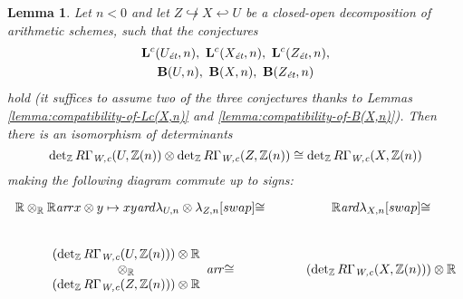 \documentclass[10pt,a4paper,oneside]{article}
\newcommand{\RR}{\mathbb{R}}
\newcommand{\ZZ}{\mathbb{Z}}
\renewcommand{\det}{\operatorname{det}}
\newcommand{\ar}{\text{\it ar}}
\newcommand{\et}{\text{\it \'{e}t}}
\newcommand{\Wc}{\text{\it W,c}}
\theoremstyle{myplain}
\newtheorem{lemma}[theorem]{Lemma}
\theoremstyle{mydefinition}
\numberwithin{equation}{section}
\begin{document}
\begin{lemma}
  \label{lemma:lambda-and-closed-open-decompositions}
  Let $n < 0$ and let $Z \not\hookrightarrow X \hookleftarrow U$ be a
  closed-open decomposition of arithmetic schemes, such that the conjectures
  \begin{gather*}
    \mathbf{L}^c (U_\et,n), ~ \mathbf{L}^c (X_\et,n), ~ \mathbf{L}^c (Z_\et,n),\\
    \mathbf{B} (U,n), ~ \mathbf{B} (X,n), ~ \mathbf{B} (Z_\et,n)
  \end{gather*}
  hold (it suffices to assume two of the three conjectures thanks to Lemmas
  \ref{lemma:compatibility-of-Lc(X,n)} and \ref{lemma:compatibility-of-B(X,n)}).
  Then there is an isomorphism of determinants
  \begin{equation}
    \label{eqn:isomorphism-of-det-RGamma-Wc-for-closed-open-decompositions}
    \det_\ZZ R\Gamma_\Wc (U, \ZZ(n)) \otimes
    \det_\ZZ R\Gamma_\Wc (Z, \ZZ(n)) \cong
    \det_\ZZ R\Gamma_\Wc (X, \ZZ(n))
  \end{equation}
  making the following diagram commute up to signs:
  \begin{equation}
    \label{eqn:lambda-and-closed-open-decompositions}
    \begin{tikzcd}
      \RR \otimes_\RR \RR \ar{r}{x\otimes y \mapsto xy}\ar{d}{\lambda_{U,n} \otimes \lambda_{Z,n}}[swap]{\cong} & \RR\ar{d}{\lambda_{X,n}}[swap]{\cong} \\
      \begin{array}{c} (\det_\ZZ R\Gamma_\Wc (U, \ZZ(n)))\otimes \RR \\ \otimes_\RR \\ (\det_\ZZ R\Gamma_\Wc (Z, \ZZ(n)))\otimes \RR \end{array} \ar{r}{\cong} & (\det_\ZZ R\Gamma_\Wc (X, \ZZ(n))) \otimes \RR
    \end{tikzcd}
  \end{equation}


\end{lemma}
\end{document}

